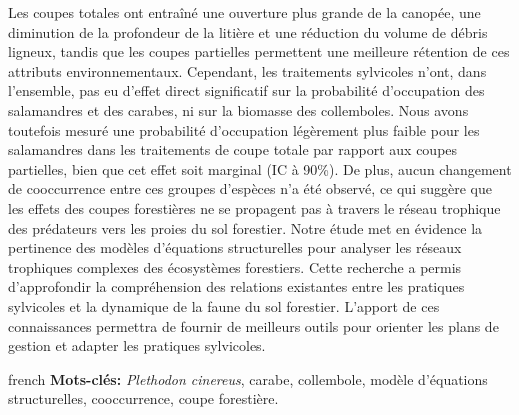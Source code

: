 Les coupes totales ont entraîné une ouverture plus grande de la canopée, une diminution de la profondeur de la litière et une réduction du volume de débris ligneux, 
tandis que les coupes partielles permettent une meilleure rétention de ces attributs environnementaux. 
Cependant, les traitements sylvicoles n’ont, dans l’ensemble, pas eu d’effet direct significatif sur la probabilité d’occupation des salamandres et des carabes, ni sur la biomasse des collemboles. 
Nous avons toutefois mesuré une probabilité d’occupation légèrement plus faible pour les salamandres dans les traitements de coupe totale par rapport aux coupes partielles, bien que cet effet soit marginal (IC à 90\%). 
De plus, aucun changement de cooccurrence entre ces groupes d’espèces n’a été observé, ce qui suggère que les effets des coupes forestières ne se propagent pas à travers le réseau trophique des prédateurs vers les proies du sol forestier. 
Notre étude met en évidence la pertinence des modèles d’équations structurelles pour analyser les réseaux trophiques complexes des écosystèmes forestiers. 
Cette recherche a permis d'approfondir la compréhension des relations existantes entre les pratiques sylvicoles et la dynamique de la faune du sol forestier. 
L'apport de ces connaissances permettra de fournir de meilleurs outils pour orienter les plans de gestion et adapter les pratiques sylvicoles. 


\begin{otherlanguage*}{french}
\textbf{Mots-clés:} \textit{Plethodon cinereus}, carabe, collembole, modèle d'équations structurelles, cooccurrence, coupe forestière.
\end{otherlanguage*}
